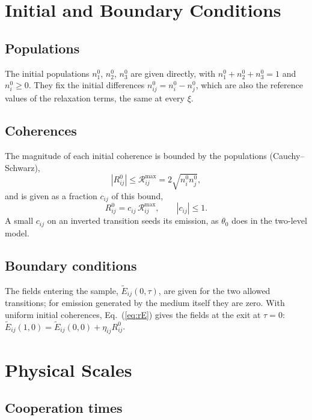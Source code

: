 \documentclass[12pt,a4paper]{article}
\newcommand{\tE}{\tilde{E}}
\begin{document}
\section{Initial and Boundary Conditions}
\label{sec:ics}

\subsection{Populations}

The initial populations $n_1^0$, $n_2^0$, $n_3^0$ are given directly, with
$n_1^0 + n_2^0 + n_3^0 = 1$ and $n_i^0 \ge 0$. They fix the initial
differences $n_{ij}^0 = n_i^0 - n_j^0$, which are also the reference values
of the relaxation terms, the same at every $\xi$.

\subsection{Coherences}

The magnitude of each initial coherence is bounded by the populations
(Cauchy--Schwarz),
\begin{equation}
  |R_{ij}^0| \le \mathcal{R}_{ij}^{\max} = 2\sqrt{n_i^0 n_j^0},
\end{equation}
and is given as a fraction $c_{ij}$ of this bound,
\begin{equation}
  R_{ij}^0 = c_{ij}\,\mathcal{R}_{ij}^{\max}, \qquad |c_{ij}| \le 1.
\end{equation}
A small $c_{ij}$ on an inverted transition seeds its emission, as $\theta_0$
does in the two-level model.

\subsection{Boundary conditions}

The fields entering the sample, $\tE_{ij}(0,\tau)$, are given for the two
allowed transitions; for emission generated by the medium itself they are
zero. With uniform initial coherences, Eq.~(\ref{eq:rE}) gives the fields at
the exit at $\tau = 0$:
$\tE_{ij}(1,0) = \tE_{ij}(0,0) + \eta_{ij} R_{ij}^0$.

\section{Physical Scales}
\label{sec:scales}

\subsection{Cooperation times}
\end{document}
